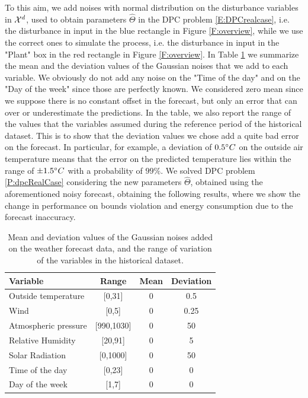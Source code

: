 \textcolor[rgb]{0,0,1}{To this aim, we add noises with normal distribution on the disturbance variables in $\mathcal{X}^d$, used to obtain parameters $\hat \Theta$ in the DPC problem \eqref{E:DPCrealcase}, i.e. the disturbance in input in the blue rectangle in Figure \ref{F:overview}, while we use the correct ones to simulate the process, i.e. the disturbance in input in the "Plant" box in the red rectangle in Figure \ref{F:overview}.
In Table \ref{T:NoiseParameters} we summarize the mean and the deviation values of the Gaussian noises that we add to each variable.
We obviously do not add any noise on the "Time of the day" and on the "Day of the week" since those are perfectly known.
We considered zero mean since we suppose there is no constant offset in the forecast, but only an error that can over or underestimate the predictions.
In the table, we also report the range of the values that the variables assumed during the reference period of the historical dataset.
This is to show that the deviation values we chose add a quite bad error on the forecast.
In particular, for example, a deviation of $0.5\degree C$ on the outside air temperature means that the error on the predicted temperature lies within the range of $\pm 1.5\degree C$ with a probability of $99\%$.
We solved DPC problem \ref{P:dpcRealCase} considering the new parameters $\hat \Theta$, obtained using the aforementioned noisy forecast, obtaining the following results, where we show the change in performance on bounds violation and energy consumption due to the forecast inaccuracy.}
\begin{table}[t!]
	\centering	
	\textcolor[rgb]{0,0,1}{\begin{tabular}{lccc}
		\toprule
		Variable               & Range      & Mean & Deviation \\ 
		\midrule
		Outside temperature    & [0,31]     & 0	   & 0.5       \\
		Wind                   & [0,5] 		& 0    & 0.25      \\
		Atmospheric pressure   & [990,1030] & 0    & 50        \\
		Relative Humidity      & [20,91]	& 0    & 5         \\
		Solar Radiation        & [0,1000]   & 0    & 50        \\
		Time of the day        & [0,23]     & 0    & 0         \\
		Day of the week        & [1,7]      & 0    & 0         \\
		\bottomrule
	\end{tabular}}
	\caption{\textcolor[rgb]{0,0,1}{Mean and deviation values of the Gaussian noises added on the weather forecast data, and the range of variation of the variables in the historical dataset.}}
	\captionsetup{justification=centering}
	\label{T:NoiseParameters}
\end{table}

